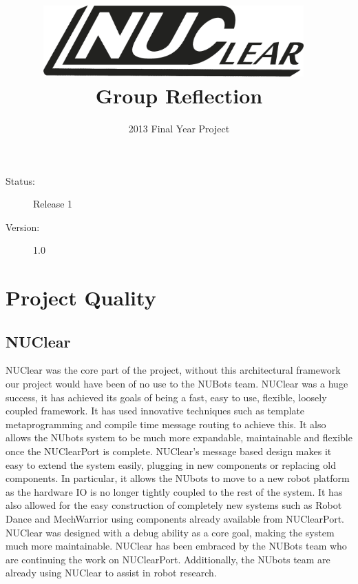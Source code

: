 \documentclass[english,12pt]{scrartcl}
\title{\includegraphics[width=0.75\textwidth]{./Logo/NUClear-logo}~\\[1cm] Group Reflection}
\author{2013 Final Year Project}
\begin{document}
	\maketitle
	\vfill
	{\large
		\begin{description}
			\item [Status:] Release 1
			\item [Version:] 1.0
		\end{description}}

	\clearpage
	\tableofcontents
		
	\clearpage

\section{Project Quality}
	\subsection{NUClear}
		NUClear was the core part of the project, without this architectural framework our project would have been of no use to the NUBots team.
		NUClear was a huge success, it has achieved its goals of being a fast, easy to use, flexible, loosely coupled framework.
		It has used innovative techniques such as template metaprogramming and compile time message routing to achieve this.
		It also allows the NUbots system to be much more expandable, maintainable and flexible once the NUClearPort is complete.
		NUClear’s message based design makes it easy to extend the system easily, plugging in new components or replacing old components.
		In particular, it allows the NUbots to move to a new robot platform as the hardware IO is no longer tightly coupled to the rest of the system.
		It has also allowed for the easy construction of completely new systems such as Robot Dance and MechWarrior using components already available from NUClearPort.
		NUClear was designed with a debug ability as a core goal, making the system much more maintainable. NUClear has been embraced by the NUBots team who are continuing the work on NUClearPort.
		Additionally, the NUbots team are already using NUClear to assist in robot research.
	
\end{document}
